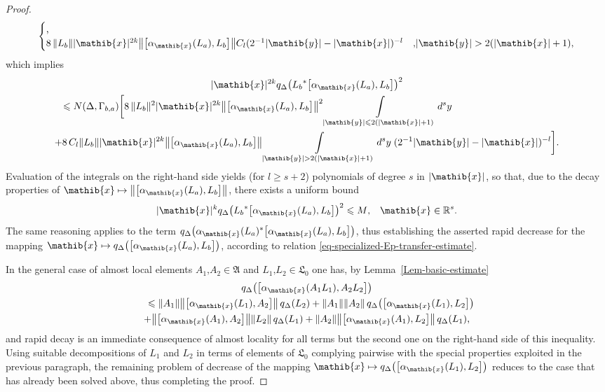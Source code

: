 \documentclass[11pt,twoside,openright]{report}
\theoremstyle{definition}
\theoremstyle{plain}
\theoremstyle{remark}
\theoremstyle{assumption}
\newcommand{\bcomm}[2]{\bigl[ #1 , #2 \bigr]}
\newcommand{\abs}[1]{\lvert #1 \rvert}
\newcommand{\norm}[1]{\lVert #1 \rVert}
\newcommand{\bnorm}[1]{\bigl\lVert #1 \bigr\rVert}
\newcommand{\qDx}[1]{q_\Delta ( #1 )}
\newcommand{\bqDx}[1]{q_\Delta \bigl( #1 \bigr)}
\newcommand{\Afrak}{\mathfrak{A}}
\newcommand{\Lfrak}{\mathfrak{L}}
\newcommand{\xib}{\mathib{x}}
\newcommand{\yib}{\mathib{y}}
\newcommand{\Rs}{\mathbb{R}^s}
\newcommand{\aibx}{\alpha_\mathib{x}}
\begin{document}
\begin{proof}
\begin{multline}
\begin{cases}
      \text{,} \\
      8 \, \norm{L_b} \abs{\xib}^{2 k} \bnorm{\bcomm{\aibx ( L_a
      )}{L_b}} C_l ( 2^{-1} \abs{\yib} - \abs{\xib} )^{-l} & \text{,}
      \abs{\yib} >  2 ( \abs{\xib} + 1 ) \text{,}
      \end{cases}
  \end{multline}
  which implies
  \begin{multline}
    \label{eq-La-Lb-integral-estimate}
    \abs{\xib}^{2 k} \bqDx{{L_b}^* \bcomm{\aibx ( L_a )}{L_b}}^2 \\
    \shoveleft{\leqslant N ( \Delta , \Gamma_{b , a} ) \biggl[ 8 \,
    \norm{L_b}^2 \abs{\xib}^{2k} \bnorm{\bcomm{\aibx ( L_a )}{L_b}}^2
    \int\limits_{\abs{\yib} \leqslant 2 ( \abs{\xib} + 1 )} d^s y} \\
    + 8 \, C_l \norm{L_b} \abs{\xib}^{2 k} \bnorm{\bcomm{\aibx ( L_a
    )}{L_b}} \int\limits_{\abs{\yib} > 2 ( \abs{\xib} + 1 )} d^s y \;
    ( 2^{-1} \abs{\yib} - \abs{\xib} )^{-l} \biggr] \text{.}
  \end{multline}
  Evaluation of the integrals on the right-hand side yields (for $l
  \geqslant s + 2$) polynomials of degree $s$ in $\abs{\xib}$, so
  that, due to the decay properties of $\xib \mapsto
  \bnorm{\bcomm{\aibx ( L_a )}{L_b}}$, there exists a uniform bound
  \begin{equation}
    \label{eq-qD-decay}
    \abs{\xib}^k \bqDx{{L_b}^* \bcomm{\aibx ( L_a )}{L_b}}^2 \leqslant
    M \text{,} \quad \xib \in \Rs \text{.}
  \end{equation}
  The same reasoning applies to the term $\bqDx{\aibx ( L_a )^*
  \bcomm{\aibx ( L_a )}{L_b}}$, thus establishing the asserted rapid
  decrease for the mapping $\xib \mapsto \bqDx{\bcomm{\aibx ( L_a
  )}{L_b}}$, according to relation
  \eqref{eq-specialized-Ep-transfer-estimate}.

  In the general case of almost local elements $A_1 \text{,} A_2 \in
  \Afrak$ and $L_1 \text{,} L_2 \in \Lfrak_0$ one has, by
  Lemma~\ref{Lem-basic-estimate}
  \begin{multline*}
    \bqDx{\bcomm{\aibx ( A_1 L_1 )}{A_2 L_2}} \\
    \shoveleft{\leqslant \norm{A_1} \bnorm{\bcomm{\aibx ( L_1 )}{A_2}}
    \, \qDx{L_2} + \norm{A_1} \norm{A_2} \, \bqDx{\bcomm{\aibx ( L_1
    )}{L_2}}} \\
    + \bnorm{\bcomm{\aibx ( A_1 )}{A_2}} \norm{L_2} \, \qDx{L_1} +
    \norm{A_2} \bnorm{\bcomm{\aibx ( A_1 )}{L_2}} \, \qDx{L_1}
    \text{,}
  \end{multline*}
  and rapid decay is an immediate consequence of almost locality for
  all terms but the second one on the right-hand side of this
  inequality. Using suitable decompositions of $L_1$ and $L_2$ in
  terms of elements of $\Lfrak_0$ complying pairwise with the special
  properties exploited in the previous paragraph, the remaining
  problem of decrease of the mapping $\xib \mapsto \bqDx{\bcomm{\aibx
  ( L_1 )}{L_2}}$ reduces to the case that has already been solved
  above, thus completing the proof. 
\end{proof}
\end{document}
